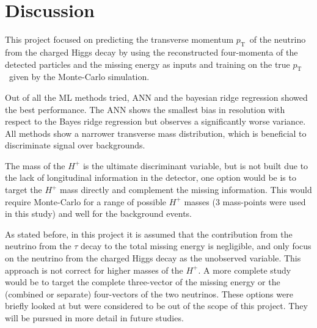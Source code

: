\documentclass{scrartcl}
\newcommand{\pt}{\ensuremath{p_\text{T}}~}
\newcommand{\mt}{\ensuremath{M_\text{T}}~}
\begin{document}

\section{Discussion}

This project focused on predicting the transverse momentum \pt of the neutrino from the charged Higgs decay by using the reconstructed four-momenta of the detected particles and the missing energy as inputs and training on the true \pt given by the Monte-Carlo simulation.

Out of all the \gls{ML} methods tried, \gls{ANN} and the bayesian ridge regression showed the best performance. The  \gls{ANN} shows the smallest bias in resolution with respect to the Bayes ridge regression but observes a significantly worse variance. All methods show a narrower transverse mass distribution, which is beneficial to discriminate signal over backgrounds.

The mass of the $H^+$ is the ultimate discriminant variable, but is not built due to the lack of longitudinal information in the detector, one option would be is to target the $H^+$ mass directly and complement the missing information. This would require Monte-Carlo for a range of possible $H^+$ masses (3 mass-points were used in this study) and well for the background events. 

As stated before, in this project it is assumed that the contribution from the neutrino from the $\tau$ decay to the total missing energy is negligible, and only focus on the neutrino from the charged Higgs decay as the unobserved variable. This approach is not correct for higher masses of the $H^+$. A more complete study would be to target the complete three-vector of the missing energy or the (combined or separate) four-vectors of the two neutrinos. These options were briefly looked at but were considered to be out of the scope of this project. They will be pursued in more detail in future studies.




\end{document}

